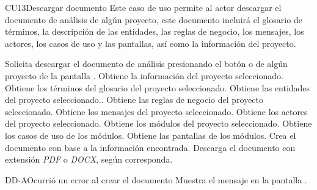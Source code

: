 	\begin{UseCase}{CU13}{Descargar documento}{
	Este caso de uso permite al actor descargar el documento de análisis de algún proyecto, este documento incluirá el glosario de términos, la descripción de las entidades, las reglas de negocio, los mensajes, los actores, los casos de uso y las pantallas, así como la información del proyecto.
	}
\end{UseCase}
\begin{UCtrayectoria}
	\UCpaso[\UCactor] Solicita descargar el documento de análisis presionando el botón  o  de algún proyecto de la pantalla .
	\UCpaso[\UCsist] Obtiene la información del proyecto seleccionado.
	\UCpaso[\UCsist] Obtiene los términos del glosario del proyecto seleccionado.
	\UCpaso[\UCsist] Obtiene las entidades del proyecto seleccionado..
	\UCpaso[\UCsist] Obtiene las reglas de negocio del proyecto seleccionado.
	\UCpaso[\UCsist] Obtiene los mensajes del proyecto seleccionado.
	\UCpaso[\UCsist] Obtiene los actores del proyecto seleccionado.
	\UCpaso[\UCsist] Obtiene los módulos del proyecto seleccionado.
	\UCpaso[\UCsist] Obtiene los casos de uso de los módulos.
	\UCpaso[\UCsist] Obtiene las pantallas de los módulos.
	\UCpaso[\UCsist] Crea el documento con base a la información encontrada. 
	\UCpaso[\UCsist] Descarga el documento con extensión {\em PDF} o {\em DOCX}, según corresponda.
\end{UCtrayectoria}		
\begin{UCtrayectoriaA}{DD-A}{Ocurrió un error al crear el documento}
	\UCpaso[\UCsist] Muestra el mensaje  en la pantalla .
\end{UCtrayectoriaA}

